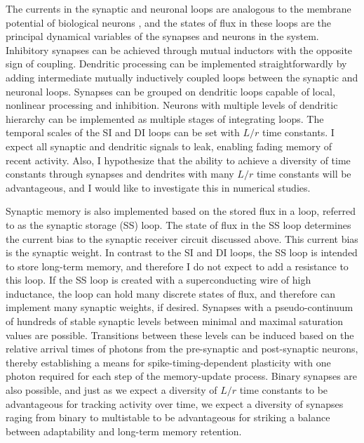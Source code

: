 \documentclass[]{article}
\begin{document}
The currents in the synaptic and neuronal loops are analogous to the membrane potential of biological neurons \cite{daab2001,geki2002}, and the states of flux in these loops are the principal dynamical variables of the synapses and neurons in the system. Inhibitory synapses can be achieved through mutual inductors with the opposite sign of coupling. Dendritic processing can be implemented straightforwardly by adding intermediate mutually inductively coupled loops between the synaptic and neuronal loops. Synapses can be grouped on dendritic loops capable of local, nonlinear processing and inhibition. Neurons with multiple levels of dendritic hierarchy can be implemented as multiple stages of integrating loops. The temporal scales of the SI and DI loops can be set with $L/r$ time constants. I expect all synaptic and dendritic signals to leak, enabling fading memory of recent activity. Also, I hypothesize that the ability to achieve a diversity of time constants through synapses and dendrites with many $L/r$ time constants will be advantageous, and I would like to investigate this in numerical studies.

Synaptic memory is also implemented based on the stored flux in a loop, referred to as the synaptic storage (SS) loop. The state of flux in the SS loop determines the current bias to the synaptic receiver circuit discussed above. This current bias is the synaptic weight. In contrast to the SI and DI loops, the SS loop is intended to store long-term memory, and therefore I do not expect to add a resistance to this loop. If the SS loop is created with a superconducting wire of high inductance, the loop can hold many discrete states of flux, and therefore can implement many synaptic weights, if desired. Synapses with a pseudo-continuum of hundreds of stable synaptic levels between minimal and maximal saturation values are possible. Transitions between these levels can be induced based on the relative arrival times of photons from the pre-synaptic and post-synaptic neurons, thereby establishing a means for spike-timing-dependent plasticity with one photon required for each step of the memory-update process. Binary synapses are also possible, and just as we expect a diversity of $L/r$ time constants to be advantageous for tracking activity over time, we expect a diversity of synapses raging from binary to multistable to be advantageous for striking a balance between adaptability and long-term memory retention.
\end{document}
